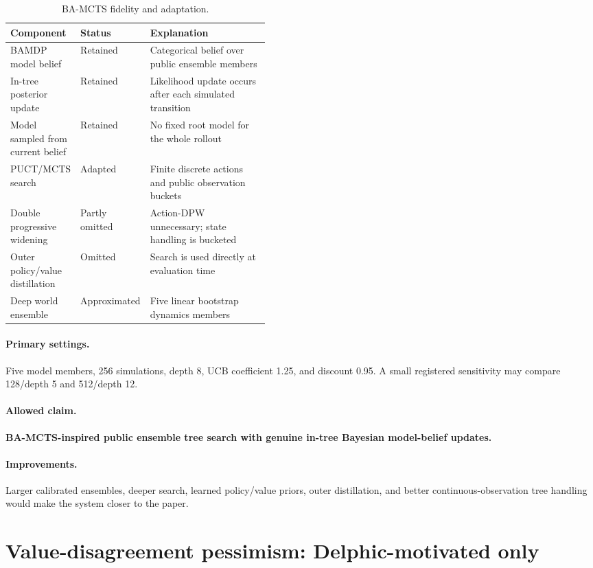 \documentclass[11pt,a4paper]{article}
\newcommand{\adaptation}[1]{\textcolor{adaptgreen}{\textbf{#1}}}
\begin{document}
\begin{table}[ht]
\centering
\caption{BA-MCTS fidelity and adaptation.}
\begin{tabularx}{\linewidth}{P{0.25\linewidth}P{0.19\linewidth}Y}
\toprule
Component & Status & Explanation \\
\midrule
BAMDP model belief & Retained & Categorical belief over public ensemble members \\
In-tree posterior update & Retained & Likelihood update occurs after each simulated transition \\
Model sampled from current belief & Retained & No fixed root model for the whole rollout \\
PUCT/MCTS search & Adapted & Finite discrete actions and public observation buckets \\
Double progressive widening & Partly omitted & Action-DPW unnecessary; state handling is bucketed \\
Outer policy/value distillation & Omitted & Search is used directly at evaluation time \\
Deep world ensemble & Approximated & Five linear bootstrap dynamics members \\
\bottomrule
\end{tabularx}
\end{table}

\paragraph{Primary settings.}
Five model members, 256 simulations, depth 8, UCB coefficient 1.25, and discount 0.95. A small
registered sensitivity may compare 128/depth 5 and 512/depth 12.

\paragraph{Allowed claim.}
\adaptation{BA-MCTS-inspired public ensemble tree search with genuine in-tree Bayesian model-belief
updates.}

\paragraph{Improvements.}
Larger calibrated ensembles, deeper search, learned policy/value priors, outer distillation, and
better continuous-observation tree handling would make the system closer to the paper.

\section{Value-disagreement pessimism: Delphic-motivated only}
\end{document}
